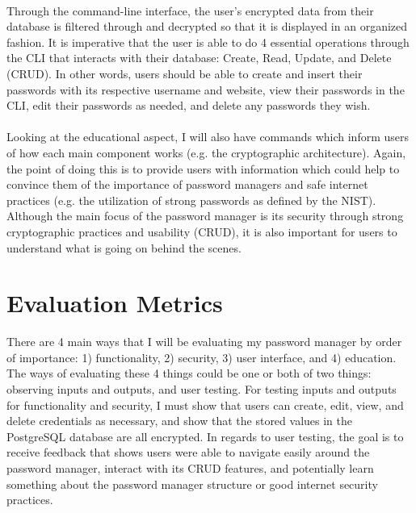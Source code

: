 \documentclass[10pt,twocolumn]{article}
\begin{document}
\paragraph{}
Through the command-line interface, the user's encrypted data from their database is filtered through and decrypted so that it is displayed in an organized fashion. It is imperative that the user is able to do 4 essential operations through the CLI that interacts with their database: Create, Read, Update, and Delete (CRUD)\cite{Olawanletjoel_2022}. In other words, users should be able to create and insert their passwords with its respective username and website, view their passwords in the CLI, edit their passwords as needed, and delete any passwords they wish.

\paragraph{}
Looking at the educational aspect, I will also have commands which inform users of how each main component works (e.g. the cryptographic architecture). Again, the point of doing this is to provide users with information which could help to convince them of the importance of password managers and safe internet practices (e.g. the utilization of strong passwords as defined by the NIST). Although the main focus of the password manager is its security through strong cryptographic practices and usability (CRUD), it is also important for users to understand what is going on behind the scenes.


\section{Evaluation Metrics}


There are 4 main ways that I will be evaluating my password manager by order of importance: 1) functionality, 2) security, 3) user interface, and 4) education. The ways of evaluating these 4 things could be one or both of two things: observing inputs and outputs, and user testing. For testing inputs and outputs for functionality and security, I must show that users can create, edit, view, and delete credentials as necessary, and show that the stored values in the PostgreSQL database are all encrypted. In regards to user testing, the goal is to receive feedback that shows users were able to navigate easily around the password manager, interact with its CRUD features, and potentially learn something about the password manager structure or good internet security practices.
\end{document}
